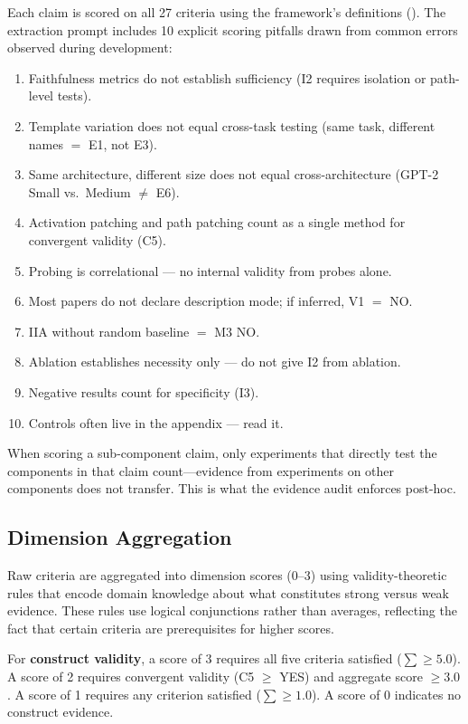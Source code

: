 \documentclass[10pt]{article}
\begin{document}
Each claim is scored on all 27 criteria using the framework's definitions (). The extraction prompt includes 10 explicit scoring pitfalls drawn from common errors observed during development:

\begin{enumerate}[nosep]
    \item Faithfulness metrics do not establish sufficiency (I2 requires isolation or path-level tests).
    \item Template variation does not equal cross-task testing (same task, different names $=$ E1, not E3).
    \item Same architecture, different size does not equal cross-architecture (GPT-2 Small vs.\ Medium $\neq$ E6).
    \item Activation patching and path patching count as a single method for convergent validity (C5).
    \item Probing is correlational --- no internal validity from probes alone.
    \item Most papers do not declare description mode; if inferred, V1 $=$ NO.
    \item IIA without random baseline $=$ M3 NO.
    \item Ablation establishes necessity only --- do not give I2 from ablation.
    \item Negative results count for specificity (I3).
    \item Controls often live in the appendix --- read it.
\end{enumerate}

When scoring a sub-component claim, only experiments that directly test the components in that claim count---evidence from experiments on other components does not transfer. This is what the evidence audit enforces post-hoc.

\subsection{Dimension Aggregation}
\label{sec:aggregation}

Raw criteria are aggregated into dimension scores (0--3) using validity-theoretic rules that encode domain knowledge about what constitutes strong versus weak evidence. These rules use logical conjunctions rather than averages, reflecting the fact that certain criteria are prerequisites for higher scores.

For \textbf{construct validity}, a score of 3 requires all five criteria satisfied ($\sum \geq 5.0$). A score of 2 requires convergent validity (C5 $\geq$ YES) and aggregate score $\geq 3.0$. A score of 1 requires any criterion satisfied ($\sum \geq 1.0$). A score of 0 indicates no construct evidence.
\end{document}
